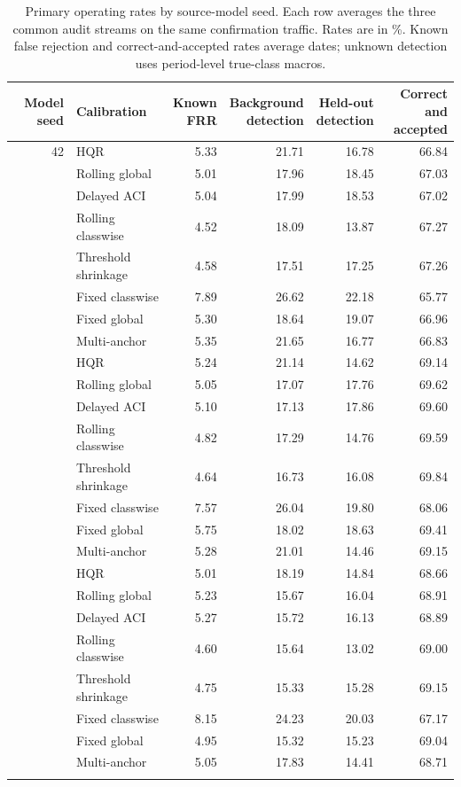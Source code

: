 \begin{table}[p]
\centering\footnotesize
\caption{Primary operating rates by source-model seed. Each row averages the three common audit streams on the same confirmation traffic. Rates are in \%. Known false rejection and correct-and-accepted rates average dates; unknown detection uses period-level true-class macros.}
\label{tab:model-seeds}
\begin{tabular}{rlrrrr}
\toprule
Model seed & Calibration & \shortstack{Known\\FRR} & \shortstack{Background\\detection} & \shortstack{Held-out\\detection} & \shortstack{Correct and\\accepted} \\
\midrule
42 & HQR & 5.33 & 21.71 & 16.78 & 66.84 \\
 & Rolling global & 5.01 & 17.96 & 18.45 & 67.03 \\
 & Delayed ACI & 5.04 & 17.99 & 18.53 & 67.02 \\
 & Rolling classwise & 4.52 & 18.09 & 13.87 & 67.27 \\
 & Threshold shrinkage & 4.58 & 17.51 & 17.25 & 67.26 \\
 & Fixed classwise & 7.89 & 26.62 & 22.18 & 65.77 \\
 & Fixed global & 5.30 & 18.64 & 19.07 & 66.96 \\
 & Multi-anchor & 5.35 & 21.65 & 16.77 & 66.83 \\
\addlinespace
43 & HQR & 5.24 & 21.14 & 14.62 & 69.14 \\
 & Rolling global & 5.05 & 17.07 & 17.76 & 69.62 \\
 & Delayed ACI & 5.10 & 17.13 & 17.86 & 69.60 \\
 & Rolling classwise & 4.82 & 17.29 & 14.76 & 69.59 \\
 & Threshold shrinkage & 4.64 & 16.73 & 16.08 & 69.84 \\
 & Fixed classwise & 7.57 & 26.04 & 19.80 & 68.06 \\
 & Fixed global & 5.75 & 18.02 & 18.63 & 69.41 \\
 & Multi-anchor & 5.28 & 21.01 & 14.46 & 69.15 \\
\addlinespace
44 & HQR & 5.01 & 18.19 & 14.84 & 68.66 \\
 & Rolling global & 5.23 & 15.67 & 16.04 & 68.91 \\
 & Delayed ACI & 5.27 & 15.72 & 16.13 & 68.89 \\
 & Rolling classwise & 4.60 & 15.64 & 13.02 & 69.00 \\
 & Threshold shrinkage & 4.75 & 15.33 & 15.28 & 69.15 \\
 & Fixed classwise & 8.15 & 24.23 & 20.03 & 67.17 \\
 & Fixed global & 4.95 & 15.32 & 15.23 & 69.04 \\
 & Multi-anchor & 5.05 & 17.83 & 14.41 & 68.71 \\
\addlinespace
\bottomrule\end{tabular}
\end{table}
